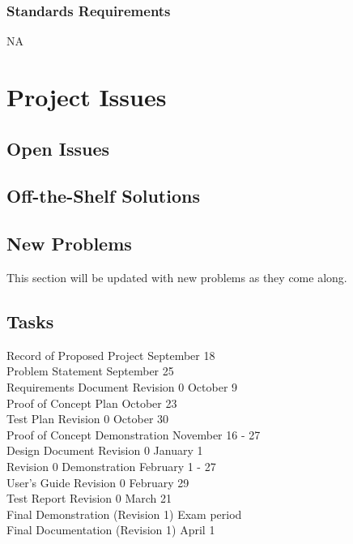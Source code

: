 \documentclass[12pt]{article}
\begin{document}
\subsubsection{Standards Requirements}
NA

\section{Project Issues}

\subsection{Open Issues} %

\subsection{Off-the-Shelf Solutions} %

\subsection{New Problems} %
This section will be updated with new problems as they come along.

\subsection{Tasks}\label{SubSec_Tasks} %
Record of Proposed Project \hfill September 18\\
Problem Statement \hfill September 25\\
Requirements Document Revision 0 \hfill	October 9\\
Proof of Concept Plan \hfill October 23\\
Test Plan Revision 0 \hfill	October 30\\
Proof of Concept Demonstration \hfill November 16 - 27\\
Design Document Revision 0 \hfill January 1\\
Revision 0 Demonstration \hfill	February 1 -  27\\
User's Guide Revision 0	\hfill February 29\\
Test Report Revision 0 \hfill March 21\\
Final Demonstration (Revision 1) \hfill	Exam period\\
Final Documentation (Revision 1) \hfill	April 1
\end{document}
